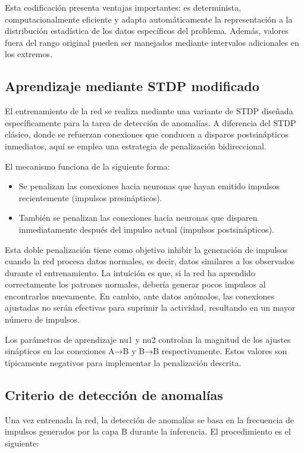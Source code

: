 Esta codificación presenta ventajas importantes: es determinista, computacionalmente eficiente y adapta automáticamente la representación a la distribución estadística de los datos específicos del problema. Además, valores fuera del rango original pueden ser manejados mediante intervalos adicionales en los extremos.

\subsection{Aprendizaje mediante STDP modificado}

El entrenamiento de la red se realiza mediante una variante de STDP diseñada específicamente para la tarea de detección de anomalías. A diferencia del STDP clásico, donde se refuerzan conexiones que conducen a disparos postsinápticos inmediatos, aquí se emplea una estrategia de penalización bidireccional.

El mecanismo funciona de la siguiente forma:

\begin{itemize}
    \item Se penalizan las conexiones hacia neuronas que hayan emitido impulsos recientemente (impulsos presinápticos).
    \item También se penalizan las conexiones hacia neuronas que disparen inmediatamente después del impulso actual (impulsos postsinápticos).
\end{itemize}

Esta doble penalización tiene como objetivo inhibir la generación de impulsos cuando la red procesa datos normales, es decir, datos similares a los observados durante el entrenamiento. La intuición es que, si la red ha aprendido correctamente los patrones normales, debería generar pocos impulsos al encontrarlos nuevamente. En cambio, ante datos anómalos, las conexiones ajustadas no serán efectivas para suprimir la actividad, resultando en un mayor número de impulsos.

Los parámetros de aprendizaje nu1 y nu2 controlan la magnitud de los ajustes sinápticos en las conexiones A→B y B→B respectivamente. Estos valores son típicamente negativos para implementar la penalización descrita.

\subsection{Criterio de detección de anomalías}

Una vez entrenada la red, la detección de anomalías se basa en la frecuencia de impulsos generados por la capa B durante la inferencia. El procedimiento es el siguiente:

